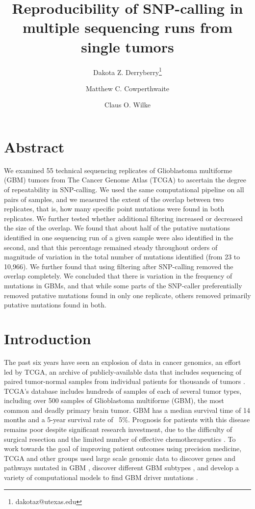 \documentclass[11pt]{article} %
\title{Reproducibility of SNP-calling in multiple sequencing runs from single tumors}
\author[1]{Dakota Z. Derryberry\thanks{dakotaz@utexas.edu}}
\author[3]{Matthew C. Cowperthwaite}
\author[1,2]{Claus O. Wilke}
\affil[1]{The University of Texas at Austin, Cell \& Molecular Biology}
\affil[2]{The University of Texas at Austin, Integrative Biology}
\affil[3]{St. David's NeuroTexas Institute Research Foundation}
\begin{document}
\maketitle

\section*{Abstract}

We examined 55 technical sequencing replicates of Glioblastoma multiforme (GBM) tumors from The Cancer Genome Atlas (TCGA) to ascertain the degree of repeatability in SNP-calling. We used the same computational pipeline on all pairs of samples, and we measured the extent of the overlap between two replicates, that is, how many specific point mutations were found in both replicates. We further tested whether additional filtering increased or decreased the size of the overlap.  We found that about half of the putative mutations identified in one sequencing run of a given sample were also identified in the second, and that this percentage remained steady throughout orders of magnitude of variation in the total number of mutations identified (from 23 to 10,966). We further found that using filtering after SNP-calling removed the overlap completely. We concluded that there is variation in the frequency of mutations in GBMs, and that while some parts of the SNP-caller preferentially removed putative mutations found in only one replicate, others removed primarily putative mutations found in both.

\section*{Introduction}

The past six years have seen an explosion of data in cancer genomics, an effort led by TCGA, an archive of publicly-available data that includes sequencing of paired tumor-normal samples from individual patients for thousands of tumors \citep{TCGA-GBM, TCGA-GBM-13}. TCGA's database includes hundreds of samples of each of several tumor types, including over 500 samples of Glioblastoma multiforme (GBM), the most common and deadly primary brain tumor. GBM has a median survival time of 14 months and a 5-year survival rate of ~5\%. Prognosis for patients with this disease remains poor despite significant research investment, due to the difficulty of surgical resection and the limited number of effective chemotherapeutics \citep{GBM-stats}. To work towards the goal of improving patient outcomes using precision medicine, TCGA and other groups \citep{Parsons} used large scale genomic data to discover genes and pathways mutated in GBM \citep{pathways}, discover different GBM subtypes \citep{subtypes}, and develop a variety of computational models to find GBM driver mutations \citep{drivers}.
\end{document}
